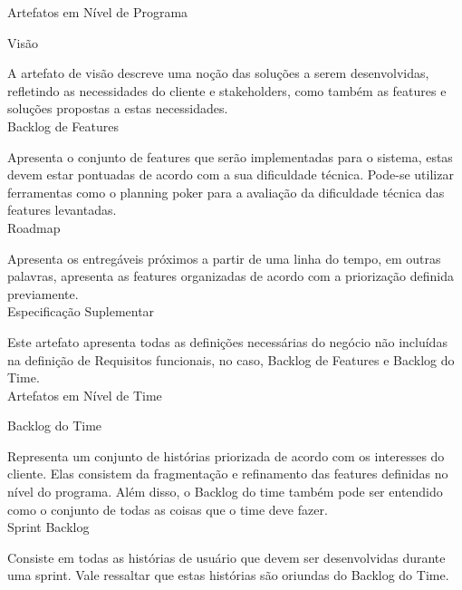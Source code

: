{\large{Artefatos em Nível de Programa \\}}


\large{Visão \\}

\tab A artefato de visão descreve uma noção das soluções a serem desenvolvidas, refletindo as necessidades do cliente e stakeholders, como também as features e soluções propostas a estas necessidades. \\

\large{Backlog de Features \\}

\tab Apresenta o conjunto de features que serão implementadas para o sistema, estas devem estar pontuadas de acordo com a sua dificuldade técnica. Pode-se utilizar ferramentas como o planning poker para a avaliação da dificuldade técnica das features levantadas. \\

\large{Roadmap \\}

\tab Apresenta os entregáveis próximos a partir de uma linha do tempo, em outras palavras, apresenta as features organizadas de acordo com a priorização definida previamente. \\

\large{Especificação Suplementar\\}

\tab Este artefato apresenta todas as definições necessárias do negócio não incluídas na definição de Requisitos funcionais, no caso, Backlog de Features e Backlog do Time. \\

\large{Artefatos em Nível de Time \\}


\large{Backlog do Time \\}

\tab Representa um conjunto de histórias priorizada de acordo com os interesses do cliente. Elas consistem da fragmentação e refinamento das features definidas no nível do programa. Além disso, o Backlog do time também pode ser entendido como o conjunto de todas as coisas que o time deve fazer. \\

\large{Sprint Backlog\\}

\tab Consiste em todas as histórias de usuário que devem ser desenvolvidas durante uma sprint. Vale ressaltar que estas histórias são oriundas do Backlog do Time. \\

